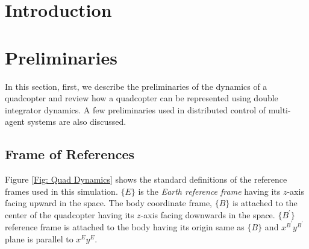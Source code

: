 \documentclass[letterpaper, 10 pt, conference]{ieeeconf}
\begin{document}
\section{Introduction}





\section{Preliminaries}\label{sec:prelim}
In this section, first, we describe the preliminaries of the dynamics of a quadcopter and review how a quadcopter can be represented using double integrator dynamics. A few preliminaries used in distributed control of multi-agent systems are also discussed.
\subsection{Frame of References}\label{subsec:for}
Figure \ref{Fig: Quad Dynamics} shows the standard definitions \cite{Robotics_Vision_Control} of the reference frames used in this simulation. $\{E\}$ is the \textit{Earth reference frame} having its $z$-axis facing upward in the space. The body coordinate frame, $\{B\}$ is attached to the center of the quadcopter having its $z$-axis facing downwards in the space. $\{B^{\prime}\}$ reference frame is attached to the body having its origin same as $\{B\}$ and $x^{B^{\prime}}y^{B^{\prime}}$ plane is parallel to $x^{E}y^{E}$.
\end{document}
